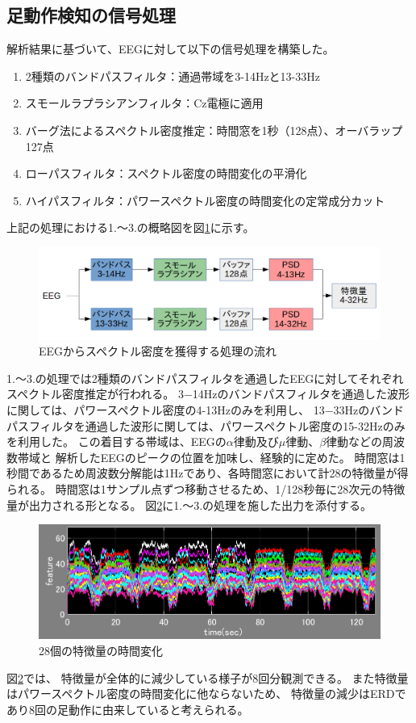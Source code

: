 \subsection{足動作検知の信号処理}
解析結果に基づいて、EEGに対して以下の信号処理を構築した。
\begin{enumerate}
    \item 2種類のバンドパスフィルタ：通過帯域を3-14Hzと13-33Hz
    \item スモールラプラシアンフィルタ：Cz電極に適用
    \item バーグ法によるスペクトル密度推定：時間窓を1秒（128点）、オーバラップ127点
    \item ローパスフィルタ：スペクトル密度の時間変化の平滑化
    \item ハイパスフィルタ：パワースペクトル密度の時間変化の定常成分カット
\end{enumerate}
上記の処理における1.〜3.の概略図を図\ref{fig:footBCI}に示す。
\begin{figure}
    \centering
    \includegraphics[width=13cm]{images/footBCI.png}
    \caption{EEGからスペクトル密度を獲得する処理の流れ}
    \label{fig:footBCI}
\end{figure}
1.〜3.の処理では2種類のバンドパスフィルタを通過したEEGに対してそれぞれスペクトル密度推定が行われる。
3−14Hzのバンドパスフィルタを通過した波形に関しては、パワースペクトル密度の4-13Hzのみを利用し、
13−33Hzのバンドパスフィルタを通過した波形に関しては、パワースペクトル密度の15-32Hzのみを利用した。
この着目する帯域は、EEGの\(\alpha\)律動及び\(\mu\)律動、\(\beta\)律動などの周波数帯域と
解析したEEGのピークの位置を加味し、経験的に定めた。
時間窓は1秒間であるため周波数分解能は1Hzであり、各時間窓において計28の特徴量が得られる。
時間窓は1サンプル点ずつ移動させるため、1/128秒毎に28次元の特徴量が出力される形となる。
図\ref{fig:nofilterERD}に1.〜3.の処理を施した出力を添付する。
\begin{figure}[p]
    \centering
    \includegraphics[width=13cm]{images/feature_sub1_nofilter.png}
    \caption{28個の特徴量の時間変化}
    \label{fig:nofilterERD}
\end{figure}
図\ref{fig:nofilterERD}では、
特徴量が全体的に減少している様子が8回分観測できる。
また特徴量はパワースペクトル密度の時間変化に他ならないため、
特徴量の減少はERDであり8回の足動作に由来していると考えられる。


